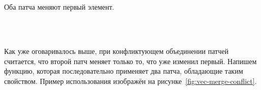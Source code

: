 \begin{code}%
\>[0]\<[4]%
\>[4] \AgdaSymbol{:}  \AgdaSymbol{\{}\AgdaSymbol{\}\{}  \AgdaSymbol{:}  \AgdaSymbol{\}} \AgdaSymbol{\{} \AgdaSymbol{:}  \AgdaSymbol{\}} \AgdaSymbol{\{} \AgdaSymbol{:}  \AgdaSymbol{\}}\<%
\\
\>[4]\<[6]%
\>[6] \AgdaSymbol{(}  \AgdaSymbol{:} \AgdaSymbol{)}  \AgdaSymbol{(}  \AgdaSymbol{)}\<%
\\
\>[4]\<[6]%
\>[6] \AgdaSymbol{(}     \AgdaSymbol{)}  \AgdaSymbol{(} \AgdaSymbol{)}\<%
\end{code}

Оба патча меняют первый элемент.

\begin{code}%
\>[0]\<[4]%
\>[4] \AgdaSymbol{:}  \AgdaSymbol{\{}\AgdaSymbol{\}\{}  \AgdaSymbol{:}  \AgdaSymbol{\}} \AgdaSymbol{\{} \AgdaSymbol{:}  \AgdaSymbol{\}} \AgdaSymbol{\{} \AgdaSymbol{:}  \AgdaSymbol{\}}\<%
\\
\>[4]\<[6]%
\>[6] \AgdaSymbol{(}   \AgdaSymbol{:} \AgdaSymbol{)}  \AgdaSymbol{(}  \AgdaSymbol{)}\<%
\\
\>[4]\<[6]%
\>[6] \AgdaSymbol{(}     \AgdaSymbol{)}  \AgdaSymbol{(}     \AgdaSymbol{)}\<%
\end{code}


Как уже оговаривалось выше, при конфликтующем объединении патчей
считается, что второй патч меняет только то, что уже изменил первый.
Напишем функцию, которая последовательно применяет два патча,
обладающие таким свойством. Пример использования изображён на 
рисунке~\ref{fig:vec-merge-conflict}.

